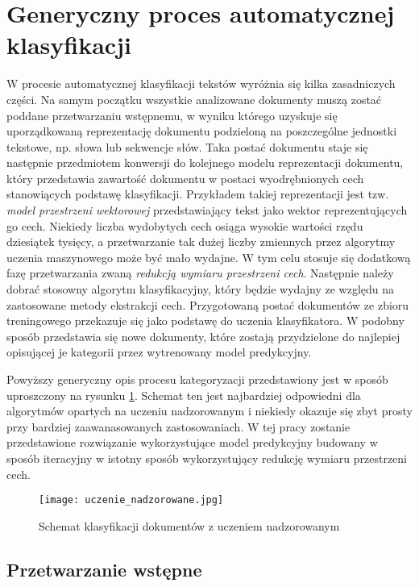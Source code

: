 \documentclass{pracamgr}
\begin{document}
\section{Generyczny proces automatycznej klasyfikacji}

W procesie automatycznej klasyfikacji tekstów wyróżnia się kilka zasadniczych części. Na samym początku wszystkie analizowane dokumenty muszą zostać poddane przetwarzaniu wstępnemu, w wyniku którego uzyskuje się uporządkowaną reprezentację dokumentu podzieloną na poszczególne jednostki tekstowe, np. słowa lub sekwencje słów. Taka postać dokumentu staje się następnie przedmiotem konwersji do kolejnego modelu reprezentacji dokumentu, który przedstawia zawartość dokumentu w postaci wyodrębnionych cech stanowiących podstawę klasyfikacji. Przykładem takiej reprezentacji jest tzw. \textit{model przestrzeni wektorowej} przedstawiający tekst jako wektor reprezentujących go cech. Niekiedy liczba wydobytych cech osiąga wysokie wartości rzędu dziesiątek tysięcy, a przetwarzanie tak dużej liczby zmiennych przez algorytmy uczenia maszynowego może być mało wydajne. W tym celu stosuje się dodatkową fazę przetwarzania zwaną \textit{redukcją wymiaru przestrzeni cech}. Następnie należy dobrać stosowny algorytm klasyfikacyjny, który będzie wydajny ze względu na zastosowane metody ekstrakcji cech. Przygotowaną postać dokumentów ze zbioru treningowego przekazuje się jako podstawę do uczenia klasyfikatora. W podobny sposób przedstawia się nowe dokumenty, które zostają przydzielone do najlepiej opisującej je kategorii przez wytrenowany model predykcyjny.

Powyższy generyczny opis procesu kategoryzacji przedstawiony jest w sposób uproszczony na rysunku \ref{fig:supervised}. Schemat ten jest najbardziej odpowiedni dla algorytmów opartych na uczeniu nadzorowanym i niekiedy okazuje się zbyt prosty przy bardziej zaawanasowanych zastosowaniach. W tej pracy zostanie przedstawione rozwiązanie wykorzystujące model predykcyjny budowany w sposób iteracyjny w istotny sposób wykorzystujący redukcję wymiaru przestrzeni cech.

\begin{figure}[H]
    \centering
    \texttt{[image: uczenie\_nadzorowane.jpg]}
    \caption{Schemat klasyfikacji dokumentów z uczeniem nadzorowanym}
    \label{fig:supervised}
\end{figure}

\subsection{Przetwarzanie wstępne}
\end{document}

